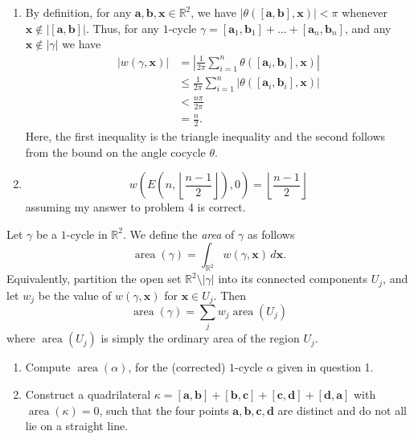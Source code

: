 \documentclass[12 pt, letterpaper]{hmcpset}
\begin{document}
\begin{solution}
	\begin{enumerate}
		\item By definition, for any $\mathbf{a}, \mathbf{b}, \mathbf{x} \in \mathbb{R}^{2}$, we have $\lvert \theta([\mathbf{a}, \mathbf{b}], \mathbf{x}) \rvert < \pi$ whenever $\mathbf{x} \notin \lvert [\mathbf{a}, \mathbf{b}] \rvert$. Thus, for any $1$-cycle $\gamma = [\mathbf{a}_{1}, \mathbf{b}_{1}] + \dots + [\mathbf{a}_{n}, \mathbf{b}_{n}]$, and any $\mathbf{x} \notin \lvert \gamma \rvert$ we have
			 \begin{align*}
				 \lvert w(\gamma, \mathbf{x}) \rvert & = \left \lvert \frac{1}{2 \pi} \sum_{i = 1}^{n} \theta([\mathbf{a}_{i}, \mathbf{b}_{i}], \mathbf{x}) \right \rvert \\
								     & \le \frac{1}{2 \pi} \sum_{i = 1}^{n} \lvert \theta([\mathbf{a}_{i}, \mathbf{b}_{i}], \mathbf{x}) \rvert \\
								     & < \frac{n \pi}{2 \pi} \\
								     & = \frac{n}{2}.
			\end{align*}
			Here, the first inequality is the triangle inequality and the second follows from the bound on the angle cocycle $\theta$.
		\item
			\[
				\boxed{
					w \left ( E \left ( n, \left \lfloor \frac{n - 1}{2} \right \rfloor \right ), 0 \right ) = \left \lfloor \frac{n - 1}{2} \right \rfloor
			}
			\]
			assuming my answer to problem 4 is correct.
	\end{enumerate}
\end{solution}

\pagebreak

\begin{problem}[6.]
	Let $\gamma$ be a $1$-cycle in $\mathbb{R}^{2}$. We define the \emph{area} of $\gamma$ as follows
	\[
		\operatorname{area}(\gamma) = \int_{\mathbb{R}^{2}} w(\gamma, \mathbf{x}) \, d\mathbf{x}.
	\]
	Equivalently, partition the open set $\mathbb{R}^{2} \setminus \lvert \gamma \rvert$ into its connected components $U_{j}$, and let $w_{j}$ be the value of $w(\gamma, \mathbf{x})$ for $\mathbf{x} \in U_{j}$. Then
	\[
		\operatorname{area}(\gamma) = \sum_{j} w_{j} \operatorname{area}(U_{j}) 
	\]
	where $\operatorname{area}(U_{j})$ is simply the ordinary area of the region $U_{j}$.
	\begin{enumerate}
		\item Compute $\operatorname{area}(\alpha)$, for the (corrected) $1$-cycle $\alpha$ given in question 1.
		\item Construct a quadrilateral $\kappa = [\mathbf{a}, \mathbf{b}] + [\mathbf{b}, \mathbf{c}] + [\mathbf{c}, \mathbf{d}] + [\mathbf{d}, \mathbf{a}]$ with $\operatorname{area}(\kappa) = 0$, such that the four points $\mathbf{a}, \mathbf{b}, \mathbf{c}, \mathbf{d}$ are distinct and do not all lie on a straight line.
	\end{enumerate}
\end{problem}
\end{document}
